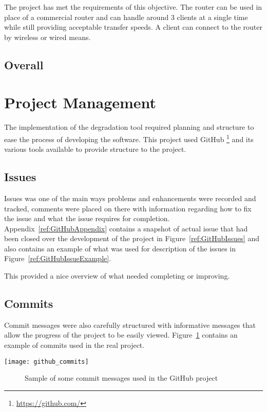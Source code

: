 The project has met the requirements of this objective. The router can be used in place of a commercial router and can handle around 3 clients at a single time while still providing acceptable transfer speeds. A client can connect to the router by wireless or wired means.

\subsection{Overall}


\section{Project Management}
The implementation of the degradation tool required planning and structure to ease the process of developing the software. This project used GitHub \footnote{\url{https://github.com/}} and its various tools available to provide structure to the project.

\subsection{Issues}
Issues was one of the main ways problems and enhancements were recorded and tracked, comments were placed on there with information regarding how to fix the issue and what the issue requires for completion. Appendix~\ref{ref:GitHubAppendix} contains a snapshot of actual issue that had been closed over the development of the project in Figure~\ref{ref:GitHubIssues} and also contains an example of what was used for description of the issues in Figure~\ref{ref:GitHubIssueExample}.

This provided a nice overview of what needed completing or improving.

\subsection{Commits}
Commit messages were also carefully structured with informative messages that allow the progress of the project to be easily viewed. Figure~\ref{ref:githubCommits} contains an example of commits used in the real project.

\begin{center}
	\texttt{[image: github\_commits]}
	\begin{figure}[h]
		\caption{Sample of some commit messages used in the GitHub project}
		\label{ref:githubCommits}
	\end{figure}
\end{center}

